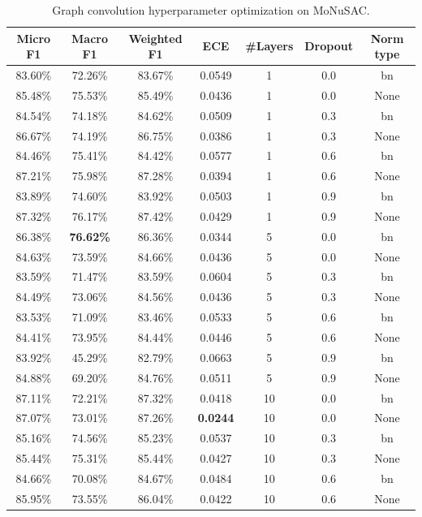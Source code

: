 \begin{table}[ht]
    \centering
    \caption{Graph convolution hyperparameter optimization on MoNuSAC.}
\begin{tabular}{|c|c|c|c|c|c|c|}
\hline
Micro F1 & Macro F1 & Weighted F1 & ECE & \#Layers & Dropout & Norm type\\ \hline
83.60\% & 72.26\% & 83.67\% & 0.0549 & 1 & 0.0 & bn\\ \hline
85.48\% & 75.53\% & 85.49\% & 0.0436 & 1 & 0.0 & None\\ \hline
84.54\% & 74.18\% & 84.62\% & 0.0509 & 1 & 0.3 & bn\\ \hline
86.67\% & 74.19\% & 86.75\% & 0.0386 & 1 & 0.3 & None\\ \hline
84.46\% & 75.41\% & 84.42\% & 0.0577 & 1 & 0.6 & bn\\ \hline
87.21\% & 75.98\% & 87.28\% & 0.0394 & 1 & 0.6 & None\\ \hline
83.89\% & 74.60\% & 83.92\% & 0.0503 & 1 & 0.9 & bn\\ \hline
87.32\% & 76.17\% & 87.42\% & 0.0429 & 1 & 0.9 & None\\ \hline
86.38\% & \textbf{76.62\%} & 86.36\% & 0.0344 & 5 & 0.0 & bn\\ \hline
84.63\% & 73.59\% & 84.66\% & 0.0436 & 5 & 0.0 & None\\ \hline
83.59\% & 71.47\% & 83.59\% & 0.0604 & 5 & 0.3 & bn\\ \hline
84.49\% & 73.06\% & 84.56\% & 0.0436 & 5 & 0.3 & None\\ \hline
83.53\% & 71.09\% & 83.46\% & 0.0533 & 5 & 0.6 & bn\\ \hline
84.41\% & 73.95\% & 84.44\% & 0.0446 & 5 & 0.6 & None\\ \hline
83.92\% & 45.29\% & 82.79\% & 0.0663 & 5 & 0.9 & bn\\ \hline
84.88\% & 69.20\% & 84.76\% & 0.0511 & 5 & 0.9 & None\\ \hline
87.11\% & 72.21\% & 87.32\% & 0.0418 & 10 & 0.0 & bn\\ \hline
87.07\% & 73.01\% & 87.26\% & \textbf{0.0244} & 10 & 0.0 & None\\ \hline
85.16\% & 74.56\% & 85.23\% & 0.0537 & 10 & 0.3 & bn\\ \hline
85.44\% & 75.31\% & 85.44\% & 0.0427 & 10 & 0.3 & None\\ \hline
84.66\% & 70.08\% & 84.67\% & 0.0484 & 10 & 0.6 & bn\\ \hline
85.95\% & 73.55\% & 86.04\% & 0.0422 & 10 & 0.6 & None\\ \hline

\end{tabular}
\end{table}
